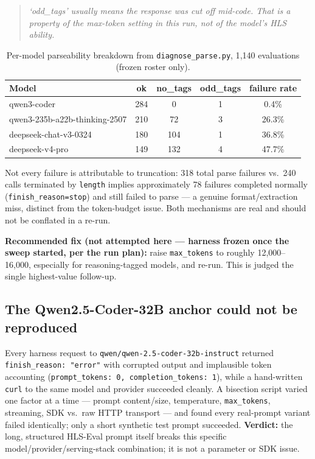 \documentclass[11pt]{article}
\newcommand{\code}[1]{\texttt{#1}}
\begin{document}
\begin{quote}
\emph{`odd\_tags' usually means the response was cut off mid-code. That
is a property of the max-token setting in this run, not of the model's
HLS ability.}
\end{quote}

\begin{table}[h]
\centering
\begin{tabular}{@{}lcccc@{}}
\toprule
\textbf{Model} & \textbf{ok} & \textbf{no\_tags} & \textbf{odd\_tags} & \textbf{failure rate} \\
\midrule
qwen3-coder & 284 & 0 & 1 & 0.4\% \\
qwen3-235b-a22b-thinking-2507 & 210 & 72 & 3 & 26.3\% \\
deepseek-chat-v3-0324 & 180 & 104 & 1 & 36.8\% \\
deepseek-v4-pro & 149 & 132 & 4 & 47.7\% \\
\bottomrule
\end{tabular}
\caption{Per-model parseability breakdown from \code{diagnose\_parse.py}, 1{,}140 evaluations (frozen roster only).}
\end{table}

Not every failure is attributable to truncation: 318 total parse
failures vs.\ 240 calls terminated by \code{length} implies
approximately 78 failures completed normally
(\code{finish\_reason=stop}) and still failed to parse --- a genuine
format/extraction miss, distinct from the token-budget issue. Both
mechanisms are real and should not be conflated in a re-run.

\textbf{Recommended fix (not attempted here --- harness frozen once the
sweep started, per the run plan):} raise \code{max\_tokens} to roughly
12{,}000--16{,}000, especially for reasoning-tagged models, and re-run.
This is judged the single highest-value follow-up.

\subsection{The Qwen2.5-Coder-32B anchor could not be reproduced}

Every harness request to \code{qwen/qwen-2.5-coder-32b-instruct}
returned \code{finish\_reason: "error"} with corrupted output and
implausible token accounting (\code{prompt\_tokens: 0,
completion\_tokens: 1}), while a hand-written \code{curl} to the same
model and provider succeeded cleanly. A bisection script varied one
factor at a time --- prompt content/size, temperature, \code{max\_tokens},
streaming, SDK vs.\ raw HTTP transport --- and found every real-prompt
variant failed identically; only a short synthetic test prompt
succeeded. \textbf{Verdict:} the long, structured HLS-Eval prompt itself
breaks this specific model/provider/serving-stack combination; it is
not a parameter or SDK issue.
\end{document}
